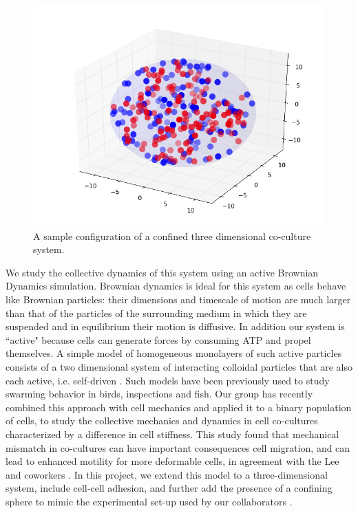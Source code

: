 \documentclass[aps,prb,twocolumn,groupedaddress,nofootinbib,floatfix]{revtex4}
\begin{document}
\begin{figure}
  \includegraphics[width=1.0\columnwidth]{images/3dconf.png}
  \caption[3dconf]
    {A sample configuration of a confined three dimensional co-culture system.}
   \label{fig:3dconf}
\end{figure}

We study the collective dynamics of this system using an active Brownian Dynamics simulation. Brownian dynamics is ideal for this system as cells behave like Brownian particles: 
their dimensions and timescale of motion are much larger than that of the particles of the surrounding medium in which they are suspended and in equilibrium  their motion is diffusive. In addition
our system is ``active" because cells can generate forces by consuming ATP and propel themselves. A simple model of homogeneous monolayers of such active particles consists
of a two dimensional system of interacting colloidal particles that are also each active, i.e. self-driven \cite{FilyMarchetti,RednerBaskaran}. 
Such models have been previously used to study swarming  behavior \cite{Vicsek} in birds, inspections and fish. Our group has recently combined this approach with cell 
mechanics and applied it to a binary population of cells, to study the collective mechanics and dynamics in cell co-cultures characterized by a difference in cell stiffness.
This study found that mechanical mismatch in co-cultures can have important consequences cell migration, and can lead to enhanced motility for more deformable cells\cite{Butcher}, 
in agreement with the Lee and coworkers \cite{Lee}. In this project, we extend this model to a three-dimensional system, include cell-cell adhesion, and further add the presence of a 
confining sphere to mimic the experimental set-up used by our collaborators \cite{Mingming}. 
\end{document}

